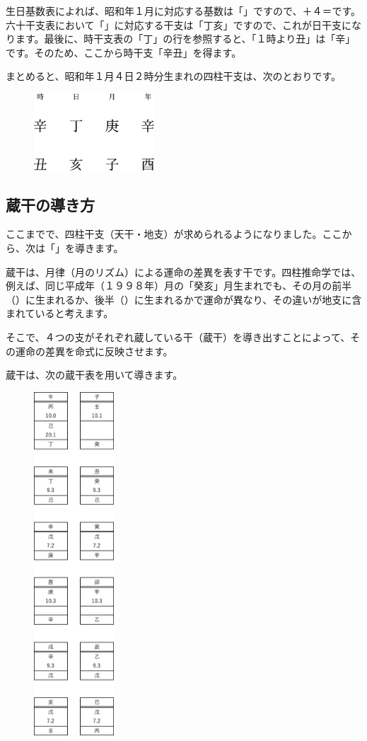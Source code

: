 \documentclass[a5paper,11pt,dvipdfmx]{tarticle}
\begin{document}
生日基数表によれば、昭和年１月に対応する基数は「」ですので、＋４＝です。六十干支表において「」に対応する干支は「丁亥」ですので、これが日干支になります。最後に、時干支表の「丁」の行を参照すると、「１時より丑」は「辛」です。そのため、ここから時干支「辛丑」を得ます。

まとめると、昭和年１月４日２時分生まれの四柱干支は、次のとおりです。

\begin{figure}[h]
  \includegraphics[width=45mm,angle=90]{figs/figure3-7.eps}
\end{figure}

\subsection{蔵干の導き方}
ここまでで、四柱干支（天干・地支）が求められるようになりました。ここから、次は「」を導きます。

蔵干は、月律（月のリズム）による運命の差異を表す干です。四柱推命学では、例えば、同じ平成年（１９９８年）月の「癸亥」月生まれでも、その月の前半（）に生まれるか、後半（）に生まれるかで運命が異なり、その違いが地支に含まれていると考えます。

そこで、４つの支がそれぞれ蔵している干（蔵干）を導き出すことによって、その運命の差異を命式に反映させます。

蔵干は、次の蔵干表を用いて導きます。

\begin{figure}[h]
  \includegraphics[width=30mm,angle=90]{figs/figure3-9.eps}
\end{figure}
\end{document}
